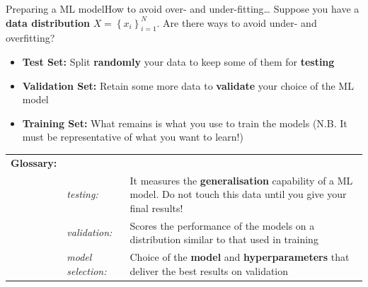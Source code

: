 \begin{frame}{Preparing a ML model}{How to avoid over- and under-fitting\dots}
    Suppose you have a \textbf{data distribution} $X = \left\{ x_i \right\}_{i = 1}^N$.
    Are there ways to avoid under- and overfitting?

    \begin{center}
        
    \end{center}

    \begin{itemize}[<+->]
        \item \textcolor{CEAred}{\textbf{Test Set:}} Split \textbf{randomly} your data to keep some of them for \textbf{testing}
        \item \textcolor{CEAred}{\textbf{Validation Set:}} Retain some more data to \textbf{validate} your choice of the ML model
        \item \textcolor{CEAred}{\textbf{Training Set:}} What remains is what you use to train the models (N.B. \alert{It must be representative of what you want to learn!})
    \end{itemize}

    \vfill \pause

    {\footnotesize
        \begin{tabular}{@{}llp{28em}@{}}
            \textbf{Glossary:} &                         &                                                                                                                                     \\
                               & \emph{testing:}         & It measures the \textbf{generalisation} capability of a ML model. \alert{Do not touch this data until you give your final results!} \\
                               & \emph{validation:}      & Scores the performance of the models on a distribution similar to that used in training                                             \\
                               & \emph{model selection:} & Choice of the \textbf{model} and \textbf{hyperparameters} that deliver the best results on validation                               \\
        \end{tabular}
    }
\end{frame}

